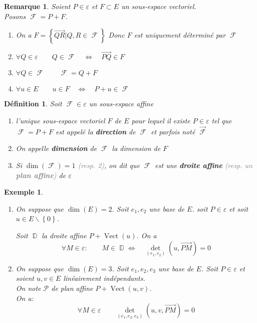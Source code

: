 \documentclass[a4paper, oneside]{report}
\theoremstyle{break}
\newtheorem{definition}[thm]{Définition}
\newtheorem{exemple}[thm]{Exemple}
\newtheorem{remarque}[thm]{Remarque}
\newcommand{\gray}[1]{\textcolor{gray}{#1}}
\DeclareMathOperator{\D}{\mathbb{D}}
\DeclareMathOperator{\F}{\mathcal{F}}
\renewcommand{\P}{\mathcal{P}}
\DeclarePairedDelimiter\ens{\left\{ }{\right\} }%
\DeclareMathOperator{\Vect}{Vect}
\renewcommand{\ens}[1]{\left\{ #1 \right\} }%
\newcommand{\slign}{\textbf}
\newcommand{\Ens}{\ens}
\newcommand{\ensF}{\F}
\newcommand{\ensP}{\P}
\newcommand{\ensD}{\D}
\begin{document}
\begin{remarque}
Soient $P \in \varepsilon$ et $F \subset E$ un sous-espace vectoriel.\\
Posons $\ensF = P + F$.
\begin{enumerate}
\item On a $F = \Ens{\vec{QR} \big| Q, R \in \ensF}$
\newline
Donc $F$ est uniquement déterminé par $\ensF$

\item $\forall Q \in \varepsilon		\qquad	Q \in \ensF		\quad	\Leftrightarrow	\quad	\vec{PQ} \in F$

\item $\forall Q \in \ensF				\qquad	\ensF = Q + F$

\item $\forall u \in E					\qquad	u \in F	\quad	\Leftrightarrow	\quad	P + u \in \ensF$
\end{enumerate}
\end{remarque}

\begin{definition}
Soit $\ensF \in \varepsilon$ un sous-espace affine
\begin{enumerate}
\item l'unique sous-espace vectoriel $F$ de $E$ pour lequel il existe $P \in \varepsilon$ tel que $\ensF = P + F$ est appelé la \slign{direction} de $\ensF$ et parfois noté $\vec{\ensF}$

\item On appelle \slign{dimension} de $\ensF$ la dimension de $F$

\item Si $\dim(\ensF) = 1$ \gray{(resp. 2)}, on dit que $\ensF$ est une \slign{droite affine} \gray{(resp. un \slign{plan affine})} de $\varepsilon$
\end{enumerate}
\end{definition}

\begin{exemple}
\begin{enumerate}
\item  On suppose que $\dim(E) = 2$. Soit $e_1, e_2$ une base de $E$. soit $P \in \varepsilon$ et soit $u \in E \backslash \ens{0}$.

Soit $\ensD$ la droite affine $P + \Vect(u)$. On a
\[
\forall M \in \varepsilon :	\qquad		M \in \ensD \Leftrightarrow	\quad	\det_{(e_1, e_2)}(u, \vec{PM}) = 0
\]

\medbreak

\item  On suppose que $\dim(E) = 3$. Soit $e_1, e_2, e_3$ une base de $E$. Soit $P \in \varepsilon$ et soient $u, v \in E$ linéairement indépendants.\\
On note $\ensP$ de plan affine $P + \Vect(u, v)$.\\
On a:
\[
\forall M \in \varepsilon	\qquad		\det_{(e_1, e_2, e_3)}(u, v, \vec{PM}) = 0
\]
\end{enumerate}
\end{exemple}
\end{document}
